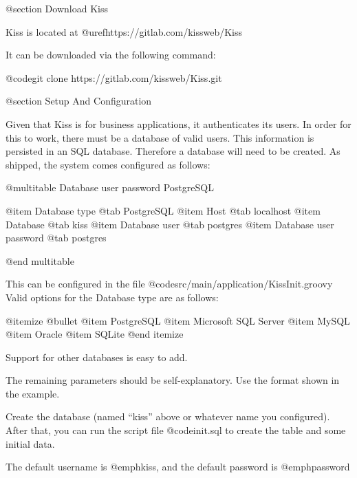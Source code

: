 @section Download Kiss


Kiss is located at @uref{https://gitlab.com/kissweb/Kiss}

It can be downloaded via the following command:

@code{git clone https://gitlab.com/kissweb/Kiss.git}

@section Setup And Configuration


Given that Kiss is for business applications, it authenticates its
users.  In order for this to work, there must be a database of valid
users.  This information is persisted in an SQL database.  Therefore a
database will need to be created.  As shipped, the system comes
configured as follows:

@multitable {Database user password} {PostgreSQL} 

@item Database type
@tab PostgreSQL
@item Host
@tab localhost
@item Database
@tab kiss
@item Database user
@tab postgres
@item Database user password
@tab postgres

@end multitable

This can be configured in the file @code{src/main/application/KissInit.groovy}
Valid options for the Database type are as follows:

@itemize @bullet
@item
PostgreSQL
@item
Microsoft SQL Server
@item
MySQL
@item
Oracle
@item
SQLite
@end itemize

Support for other databases is easy to add.

The remaining parameters should be self-explanatory.  Use the format shown in the example.

Create the database (named ``kiss'' above or whatever name you
configured).  After that, you can run the script file @code{init.sql}
to create the table and some initial data.

The default username is @emph{kiss}, and the default password is @emph{password}
